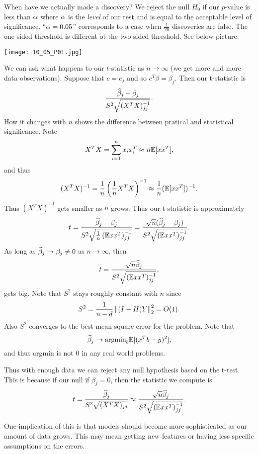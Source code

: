 When have we actually made a discovery? We reject the null $H_0$ if our $p$-value is less than ${\alpha}$ where ${\alpha}$ is the \emph{level} of our test and is equal to the acceptable level of significance. ``${\alpha} = 0.05$'' corresponds to a case when $\frac{1}{20}$ discoveries are false. The one sided threshold is different ot the two sided threshold. See below picture.
\begin{center}
    \texttt{[image: 10\_05\_P01.jpg]}
\end{center}
We can ask what happens to our $t$-statistic as $n\to \infty$ (we get more and more data observations). Suppose that $c = e_j$ and so $c^T\beta = \beta_j$. Then our t-statistic is
\[\frac{\widehat{\beta}_j-\beta_j}{S^2\sqrt{(X^TX)^{-1}_{jj}}}. \]
How it changes with $n$ shows the difference between pratical and statistical significance. Note
\[X^TX = \sum_{i=1}^n x_ix_i^T \approx n {\mathbb{E}}[xx^T], \]
and thus
\[(X^TX)^{-1} = \frac{1}{n}\left(\frac{1}{n}X^TX\right)^{-1} \approx \frac{1}{n}({\mathbb{E}}[xx^T])^{-1}. \]
Thus $(X^TX)^{-1}$ gets smaller as $n$ grows. Thus our t-statistic is approximately 
\[t=\frac{\widehat{\beta}_j-\beta_j}{S^2\sqrt{
    \frac{1}{n}\left({\mathbb{E}} xx^T\right)^{-1}_{jj}}}= \frac{\sqrt{n}(\widehat{\beta}_j-\beta_j)}{S^2\sqrt{
    \left({\mathbb{E}} xx^T\right)^{-1}_{jj}}}.\]
As long as $\widehat{\beta}_j \to \beta_j \neq 0$ as $n \to \infty$, then 
\[t = \frac{\sqrt{n}\widehat{\beta}_j}{S^2\sqrt{({\mathbb{E}} xx^T)^{-1}_{jj}}}, \]
gets big. Note that $S^2$ stays roughly constant with $n$ since
\[S^2 = \frac{1}{n-d}\left\|(I-H)Y\right\|_2^2 = O(1). \]
Also $S^2$ converges to the best mean-square error for the problem. Note that \[\widehat{\beta}_j \to \text{argmin}_{b}{\mathbb{E}}[(x^Tb-y)^2],\] 
and thus argmin is not 0 in any real world problems.

Thus with enough data we can reject any null hypothesis based on the t-test. This is because if our null if $\beta_j = 0$, then the statistic we compute is
\[t=\frac{\widehat{\beta}_j}{S^2 \sqrt{(X^TX)_{jj}}} \approx \frac{\sqrt{n}\widehat{\beta}_j}{S^2\sqrt{
    \left({\mathbb{E}} xx^T\right)^{-1}_{jj}}}. \]

One implication of this is that models should become more sophisticated as our amount of data grows. This may mean getting new features or having less specific assumptions on the errors.


